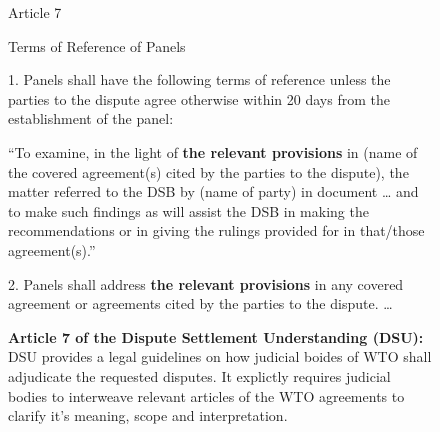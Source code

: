 \begin{figure}
  \begin{displayquote}[][]
    \begin{center}
      Article 7
    \end{center}
    \begin{center}
      Terms of Reference of Panels
    \end{center}
  
    1. Panels shall have the following terms of reference unless the parties to the dispute
    agree otherwise within 20 days from the establishment of the panel:
  
    \begin{displayquote}[][]
  
      ``To examine, in the light of {\bf the relevant provisions} in (name of the covered
      agreement(s) cited by the parties to the dispute), the matter referred to the DSB by
      (name of party) in document … and to make such findings as will assist the DSB in
      making the recommendations or in giving the rulings provided for in that/those
      agreement(s).''
        
    \end{displayquote}
  
    2. Panels shall address {\bf the relevant provisions} in any covered agreement or agreements
    cited by the parties to the dispute. \ldots
  \end{displayquote}
  \caption{\textbf{Article 7 of the Dispute Settlement Understanding (DSU): } 
  DSU provides a legal guidelines on how judicial boides of WTO shall adjudicate the requested disputes.
  It explictly requires judicial bodies to interweave relevant articles of the WTO agreements to clarify
  it's meaning, scope and interpretation.
  } 
  \label{fig:art7dsu}
\end{figure}

